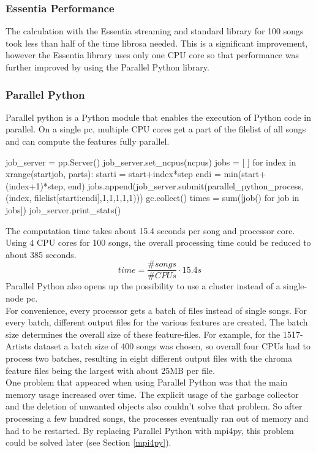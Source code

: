 \subsubsection{Essentia Performance}

The calculation with the Essentia streaming and standard library for 100 songs took less than half of the time librosa needed. This is a significant improvement, however the Essentia library uses only one CPU core so that performance was further improved by using the Parallel Python library.

\subsubsection{Parallel Python}

Parallel python is a Python module that enables the execution of Python code in parallel. On a single pc, multiple CPU cores get a part of the filelist of all songs and can compute the features fully parallel.
\begin{pythonCode}[frame=single,label={lst:pp},caption={Parallel Python},captionpos=b]
job_server = pp.Server()
job_server.set_ncpus(ncpus)
jobs = [ ]
for index in xrange(startjob, parts):
	starti = start+index*step
	endi = min(start+(index+1)*step, end)
	jobs.append(job_server.submit(parallel_python_process, (index, 
		filelist[starti:endi],1,1,1,1,1)))
	gc.collect()
times = sum([job() for job in jobs])
job_server.print_stats()
\end{pythonCode}
The computation time takes about 15.4 seconds per song and processor core. Using 4 CPU cores for 100 songs, the overall processing time could be reduced to about 385 seconds. 
\begin{equation} \label{eq:parallelp}
time = \frac{\#songs}{\#CPUs} \cdot 15.4s
\end{equation}
Parallel Python also opens up the possibility to use a cluster instead of a single-node pc.\\
For convenience, every processor gets a batch of files instead of single songs. For every batch, different output files for the various features are created. The batch size determines the overall size of these feature-files. For example, for the 1517-Artists dataset a batch size of 400 songs was chosen, so overall four CPUs had to process two batches, resulting in eight different output files with the chroma feature files being the largest with about 25MB per file.\\
One problem that appeared when using Parallel Python was that the main memory usage increased over time. The explicit usage of the garbage collector and the deletion of unwanted objects also couldn't solve that problem. So after processing a few hundred songs, the processes eventually ran out of memory and had to be restarted. By replacing Parallel Python with mpi4py, this problem could be solved later (see Section \ref{mpi4py}). 

